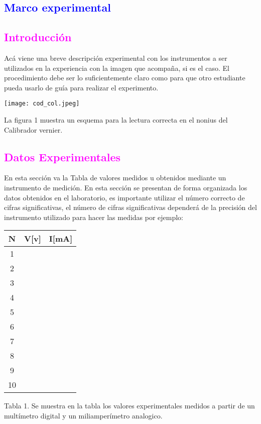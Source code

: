 \documentclass[11pt]{article}
\begin{document}
\begin{multicols}{2}
\section{\textbf{\textcolor{blue}{Marco experimental}}}
\subsection{\textbf{\textcolor{magenta}{Introducción}}}
\noindent Acá viene una breve descripción experimental con los instrumentos a ser utilizados en la experiencia con la imagen que acompaña, si es el caso. El procedimiento debe ser lo suficientemente claro como para que otro estudiante pueda usarlo de guía para realizar el experimento.
\begin{center}
\texttt{[image: cod\_col.jpeg]}
\end{center}
\noindent La figura 1 muestra un esquema para la lectura correcta en el nonius del Calibrador vernier.
\subsection{\textbf{\textcolor{magenta}{Datos Experimentales}}}
\noindent En esta sección va la Tabla de valores medidos u obtenidos mediante un instrumento de medición. En esta sección se presentan de forma organizada los datos obtenidos en el laboratorio, es importante utilizar el número correcto de cifras significativas, el número de cifras significativas dependerá de la precisión del instrumento utilizado para hacer las medidas por ejemplo:

\begin{center}
  \begin{tabular}{|c||c|c|}   \hline
 N&V[v] & I[mA] \\[0,1cm] 
            \hline \hline
            1 & & \\ \hline
            2 & &  \\ \hline
            3 & &  \\ \hline
            4 & &  \\ \hline
            5 & &  \\ \hline
            6 & &  \\ \hline
            7 & &  \\ \hline
            8 & &  \\ \hline
            9 & &  \\ \hline
            10& &  \\ \hline
\end{tabular}
 \end{center}
Tabla 1. Se muestra en la tabla los valores experimentales medidos a partir de un multímetro digital y un miliamperímetro analogico.

\end{multicols}
\end{document}
